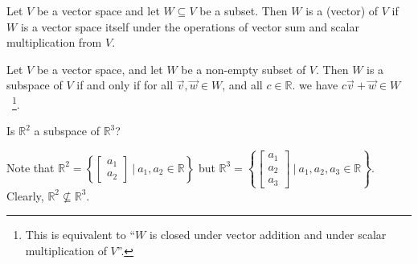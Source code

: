 \documentclass[11pt,fleqn]{book} %
\begin{document}
\setcounter{section}{2}
\setcounter{definitionT}{5}
\begin{definition}[Subspace]
    Let $V$ be a vector space and let $W \subseteq V$ be a  subset. Then $W$ is a (vector)  of $V$ if $W$ is a vector space itself under the operations of vector sum and scalar multiplication from $V$.
\end{definition}
\setcounter{section}{3}

\setcounter{section}{2}
\setcounter{dummy}{7}
\begin{theorem}
    Let $V$ be a vector space, and let $W$ be a non-empty subset of $V$. Then $W$ is a subspace of $V$ if and only if for all $\vec{v}, \vec{w} \in W$, and all $c \in \mathbb{R}$. we have $c\vec{v} + \vec{w} \in W$~\footnote{This is equivalent to ``$W$ is closed under vector addition and under scalar multiplication of $V$''. }.
\end{theorem}
\setcounter{section}{3}

\begin{example}
    Is $\mathbb{R}^2$ a subspace of $\mathbb{R}^3$? 
    
    Note that $\mathbb{R}^2 = \left\{ \begin{bmatrix}a _1 \\ a_2 \end{bmatrix} ~|~ a_1,a_2 \in \mathbb{R} \right\}$ but $\mathbb{R}^3 = \left\{ \begin{bmatrix}a _1 \\ a_2 \\ a_3 \end{bmatrix} ~|~ a_1,a_2,a_3 \in \mathbb{R} \right\}$. Clearly, $\mathbb{R}^2 \not\subseteq \mathbb{R}^3$. 
\end{example}
\end{document}
